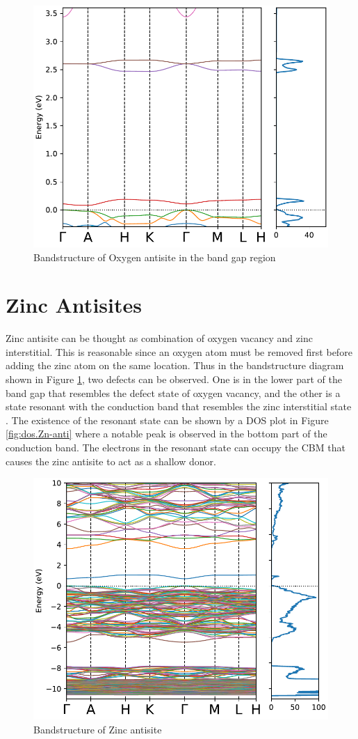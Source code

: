 \begin{figure}[tbh!]
	\centering
	\includegraphics[width=0.6\linewidth]{"images/rnd/band-dos-close_O_anti"}
	\caption[Bandstructure of Oxygen antisite in the band gap region]{Bandstructure of Oxygen antisite  in the band gap region}
\end{figure}

\section{Zinc Antisites}
Zinc antisite can be thought as combination of oxygen vacancy and zinc interstitial. This is reasonable since an oxygen atom must be removed first before adding the zinc atom on the same location.  Thus in the bandstructure diagram shown in Figure \ref{fig:bands.Zn-anti}, two defects can be observed. One is in the lower part of the band gap that resembles the defect state of oxygen vacancy, and the other is a state resonant with the conduction band that resembles the zinc interstitial state \citep{Janotti2007}. The existence of the resonant state can be shown by a DOS plot in Figure \ref{fig:dos.Zn-anti} where a notable peak is observed in the bottom part of the conduction band. The electrons in the resonant state can occupy the CBM that causes the zinc antisite to act as a shallow donor. 

\begin{figure}[tbh!]
	\centering
	\includegraphics[width=0.6\linewidth]{"images/rnd/band-dos_Zn_anti"}
	\caption[Bandstructure of Zinc antisite]{Bandstructure of Zinc antisite}
	\label{fig:bands.Zn-anti}
\end{figure}

